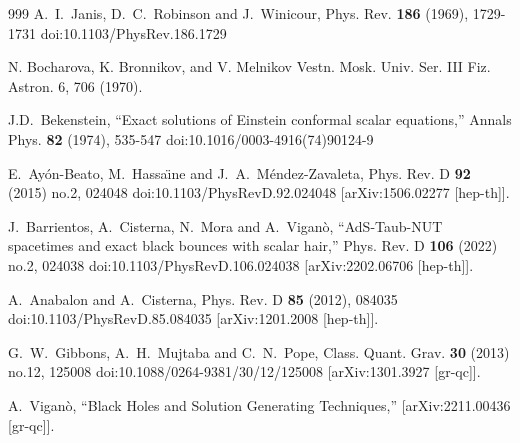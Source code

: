 \documentclass[aps,preprint,groupedaddress,nofootinbib,superscriptaddress,showkeys,showpacs,eqsecnum,amsmath,amssymb]{revtex4-1}
\begin{document}
\begin{thebibliography}{999}
A.~I.~Janis, D.~C.~Robinson and J.~Winicour,
Phys. Rev. \textbf{186} (1969), 1729-1731
doi:10.1103/PhysRev.186.1729

N. Bocharova, K. Bronnikov, and V. Melnikov Vestn. Mosk.
Univ. Ser. III Fiz. Astron. 6, 706 (1970).


J.D.~Bekenstein,
``Exact solutions of Einstein conformal scalar equations,''
Annals Phys. \textbf{82} (1974), 535-547
doi:10.1016/0003-4916(74)90124-9


E.~Ay\'on-Beato, M.~Hassa\"\i{}ne and J.~A.~M\'endez-Zavaleta,
Phys. Rev. D \textbf{92} (2015) no.2, 024048
doi:10.1103/PhysRevD.92.024048
[arXiv:1506.02277 [hep-th]].


J.~Barrientos, A.~Cisterna, N.~Mora and A.~Vigan\`o,
``AdS-Taub-NUT spacetimes and exact black bounces with scalar hair,''
Phys. Rev. D \textbf{106} (2022) no.2, 024038
doi:10.1103/PhysRevD.106.024038
[arXiv:2202.06706 [hep-th]].

A.~Anabalon and A.~Cisterna,
Phys. Rev. D \textbf{85} (2012), 084035
doi:10.1103/PhysRevD.85.084035
[arXiv:1201.2008 [hep-th]].

G.~W.~Gibbons, A.~H.~Mujtaba and C.~N.~Pope,
Class. Quant. Grav. \textbf{30} (2013) no.12, 125008
doi:10.1088/0264-9381/30/12/125008
[arXiv:1301.3927 [gr-qc]].





A.~Vigan\`o,
``Black Holes and Solution Generating Techniques,''
[arXiv:2211.00436 [gr-qc]].





\end{thebibliography}
\end{document}
